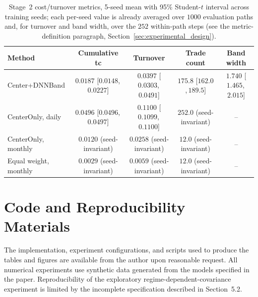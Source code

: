 \documentclass[a4paper,10pt]{article}
\begin{document}
\begin{table}[H]
\centering
\footnotesize
\caption{Stage~2 cost/turnover metrics, 5-seed mean with 95\% Student-$t$ interval across training seeds; each per-seed value is already averaged over $1000$ evaluation paths and, for turnover and band width, over the $252$ within-path steps (see the metric-definition paragraph, Section~\ref{sec:experimental_design}).}
\label{tab:full_intervals_cost}
\begin{tabular}{lcccc}
\toprule
Method & Cumulative tc & Turnover & Trade count & Band width \\
\midrule
Center+DNNBand & $0.0187$ [$0.0148$,\,$0.0227$] & $0.0397$ [$0.0303$,\,$0.0491$] & $175.8$ [$162.0$,\,$189.5$] & $1.740$ [$1.465$,\,$2.015$] \\
CenterOnly, daily & $0.0496$ [$0.0496$,\,$0.0497$] & $0.1100$ [$0.1099$,\,$0.1100$] & $252.0$ (seed-invariant) & -- \\
CenterOnly, monthly & $0.0120$ (seed-invariant) & $0.0258$ (seed-invariant) & $12.0$ (seed-invariant) & -- \\
Equal weight, monthly & $0.0029$ (seed-invariant) & $0.0059$ (seed-invariant) & $12.0$ (seed-invariant) & -- \\
\bottomrule
\end{tabular}
\end{table}

\section{Code and Reproducibility Materials}

The implementation, experiment configurations, and scripts used to produce
the tables and figures are available from the author upon reasonable request.
All numerical experiments use synthetic data generated from the models
specified in the paper. Reproducibility of the exploratory
regime-dependent-covariance experiment is limited by the incomplete
specification described in Section~5.2.
\end{document}
